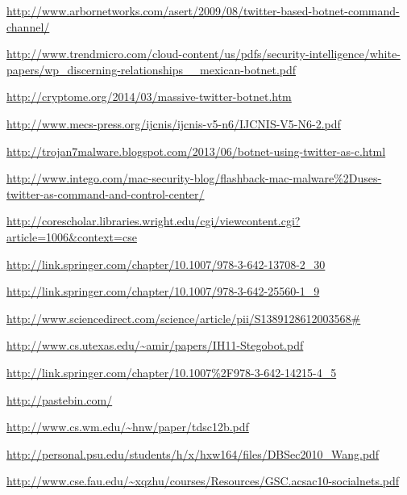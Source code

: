\documentclass[11pt, oneside]{article} %
\numberwithin{equation}{section} %
\numberwithin{figure}{section} %
\numberwithin{table}{section} %
\begin{document}
\begingroup
\renewcommand{\section}[2]{}%
\begin{thebibliography}{99}

	\url{http://www.arbornetworks.com/asert/2009/08/twitter-based-botnet-command-channel/}

	\url{http://www.trendmicro.com/cloud-content/us/pdfs/security-intelligence/white-papers/wp_discerning-relationships__mexican-botnet.pdf}

	\url{http://cryptome.org/2014/03/massive-twitter-botnet.htm}

	\url{http://www.mecs-press.org/ijcnis/ijcnis-v5-n6/IJCNIS-V5-N6-2.pdf}

	\url{http://trojan7malware.blogspot.com/2013/06/botnet-using-twitter-as-c.html}

	\url{http://www.intego.com/mac-security-blog/flashback-mac-malware\%2Duses-twitter-as-command-and-control-center/}

	\url{http://corescholar.libraries.wright.edu/cgi/viewcontent.cgi?article=1006&context=cse}

	\url{http://link.springer.com/chapter/10.1007/978-3-642-13708-2_30}

	\url{http://link.springer.com/chapter/10.1007/978-3-642-25560-1_9}

	\url{http://www.sciencedirect.com/science/article/pii/S1389128612003568#}

	\url{http://www.cs.utexas.edu/~amir/papers/IH11-Stegobot.pdf}

	\url{http://link.springer.com/chapter/10.1007\%2F978-3-642-14215-4_5}

	\url{http://pastebin.com/}

    \url{http://www.cs.wm.edu/~hnw/paper/tdsc12b.pdf}

    \url{http://personal.psu.edu/students/h/x/hxw164/files/DBSec2010_Wang.pdf}

    \url{http://www.cse.fau.edu/~xqzhu/courses/Resources/GSC.acsac10-socialnets.pdf}

\end{thebibliography}

\endgroup
\end{document}

